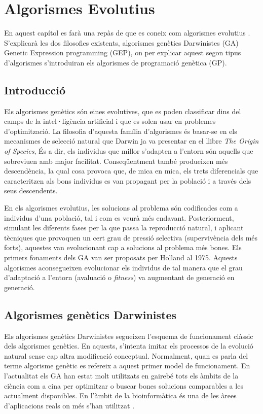 \documentclass[titlepage,a4paper,12pt]{book}
\begin{document}
\tableofcontents
\chapter{Algorismes Evolutius\label{GA}}

En aquest capítol es farà una repàs de que es coneix com algorismes evolutius
\cite{H75}. S'explicarà les dos filosofies existents,
algorismes genètics Darwinistes (GA) Genetic Expression programming (GEP),
on per explicar aquest segon tipus d'algorismes s'introduiran els algorismes de
programació genètica (GP).

\section{Introducció} Els algorismes genètics són eines evolutives, que es poden
classificar dins del camps de la intel·ligència artificial i que es solen usar
en problemes d'optimització. La filosofia d'aquesta família d'algorismes és
basar-se en els mecanismes de selecció natural que Darwin ja va presentar en el
llibre \emph{The Origin of Species}, És a dir, els individus que millor
s'adapten a l'entorn són aquells que sobreviuen amb major facilitat.
Conseqüentment també produeixen més descendència, la qual cosa provoca que, de
mica en mica, els trets diferencials que caracteritzen als bons individus es van
propagant per la població i a través dels seus descendents.

En els algorismes evolutius, les solucions al problema són codificades com a
individus d'una població, tal i com es veurà més endavant. Posteriorment,
simulant les diferents fases per la que passa la reproducció natural, i aplicant
tècniques que provoquen un cert grau de pressió selectiva (supervivència dels
més forts), aquestes van evolucionant cap a solucions al problema més bones.
Els primers fonaments dels GA van ser proposats per Holland \cite{H75} al 1975.
Aquests algorismes aconsegueixen evolucionar els individus de tal manera que el
grau d'adaptació a l'entorn (avaluació o \emph{fitness}) va augmentant de
generació en generació.

\section{Algorismes genètics Darwinistes}

Els algorismes genètics Darwinistes segueixen l'esquema de funcionament clàssic
dels algorismes genètics. En aquests, s'intenta imitar els processos de la
evolució natural sense cap altra modificació conceptual. Normalment, quan es
parla del terme algorisme genètic es refereix a aquest primer model de
funcionament. En l'actualitat els GA han estat molt utilitzats en gairebé tots
els àmbits de la ciència com a eina per optimitzar o buscar bones solucions
comparables a les actualment disponibles. En l'àmbit de la bioinformàtica és una
de les àrees d'aplicacions reals on més s'han utilitzat
\cite{PSBE01,D96,wgl:2000,WWBG95}.
\end{document}
